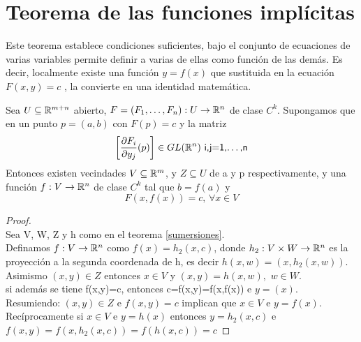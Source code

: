 \section{Teorema de las funciones implícitas}
Este teorema establece condiciones suficientes, bajo el conjunto de ecuaciones de varias variables permite definir a varias de ellas como función de las demás.
Es decir, localmente existe una función $y=f(x)$ que sustituida en la ecuación $F(x,y)=c$ , la convierte en una identidad matemática.
\begin{Teo}
Sea $U\subseteq{\mathbb{R}}^{m+n} $ abierto, $F=(F_1,\ldots,F_n):U\rightarrow{\mathbb{R}}^n$ de clase $C^k$. Supongamos que en un punto $p=(a,b)$ con $F(p)=c$ y la matriz $$\bigg[\frac{\partial F_i}{\partial y_j}(p)\bigg]\in GL({\mathbb{R}}^n)\textsf{       i,j=1,\ldots,n}$$
Entonces existen vecindades $V\subseteq {\mathbb{R}}^m$, y $Z\subseteq U$  de a y p  respectivamente, y una función $f:V\rightarrow{\mathbb{R}}^n$ de clase $C^k$ tal que $b=f(a)$ y $$F(x,f(x))=c\textsf{,    }\forall x\in V$$
\end{Teo}
\begin{proof}
  \textsf{}\\Sea V, W, Z y h como en el teorema \ref{sumersiones}.\\Definamos $f:V\rightarrow    {\mathbb{R}}^n$ como $f(x)=h_2(x,c)$, donde $h_2:V\times W\rightarrow{\mathbb{R}}^n$ es la proyección a la segunda coordenada de h, es decir $h(x,w)=(x,h_2(x,w))$. Asimismo $(x,y)\in Z$ entonces $x\in V$ y $(x,y)=h(x,w),$ $w\in W$.\\si además se tiene f(x,y)=c, entonces c=f(x,y)=f(x,f(x)) e $y=(x)$.\\
Resumiendo: $(x,y)\in Z$ e $f(x,y)=c$ implican que $x\in V$ e $y=f(x)$.\\ Recíprocamente si $x\in V$ e $y=h(x)$ entonces $y=h_2(x,c)$ e $f(x,y)=f(x,h_2(x,c))=f(h(x,c))=c$
\end{proof}